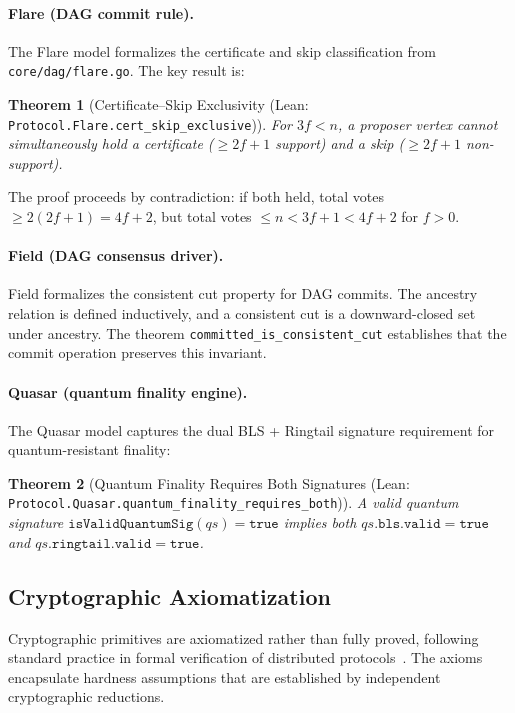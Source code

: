 \documentclass[11pt,a4paper]{article}
\newtheorem{theorem}{Theorem}[section]
\begin{document}
\paragraph{Flare (DAG commit rule).}
The Flare model formalizes the certificate and skip classification from
\texttt{core/dag/flare.go}. The key result is:

\begin{theorem}[Certificate--Skip Exclusivity (Lean: \texttt{Protocol.Flare.cert\_skip\_exclusive})]
For $3f < n$, a proposer vertex cannot simultaneously hold a certificate ($\geq 2f+1$
support) and a skip ($\geq 2f+1$ non-support).
\end{theorem}

The proof proceeds by contradiction: if both held, total votes
$\geq 2(2f+1) = 4f + 2$, but total votes $\leq n < 3f + 1 < 4f + 2$ for $f > 0$.

\paragraph{Field (DAG consensus driver).}
Field formalizes the consistent cut property for DAG commits. The ancestry relation is
defined inductively, and a consistent cut is a downward-closed set under ancestry.
The theorem \texttt{committed\_is\_consistent\_cut} establishes that the commit operation
preserves this invariant.

\paragraph{Quasar (quantum finality engine).}
The Quasar model captures the dual BLS + Ringtail signature requirement for
quantum-resistant finality:

\begin{theorem}[Quantum Finality Requires Both Signatures
(Lean: \texttt{Protocol.Quasar.quantum\_finality\_requires\_both})]
A valid quantum signature $\texttt{isValidQuantumSig}(qs) = \texttt{true}$ implies both
$qs.\texttt{bls.valid} = \texttt{true}$ and $qs.\texttt{ringtail.valid} = \texttt{true}$.
\end{theorem}

\subsection{Cryptographic Axiomatization}

Cryptographic primitives are axiomatized rather than fully proved, following standard
practice in formal verification of distributed protocols~\cite{hawblitzel2015ironfleet}.
The axioms encapsulate hardness assumptions that are established by independent
cryptographic reductions.
\end{document}
